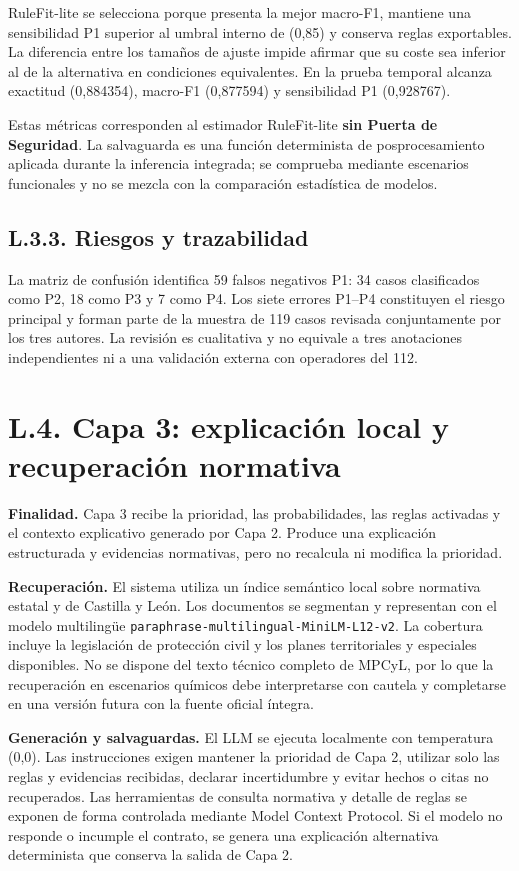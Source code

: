 RuleFit-lite se selecciona porque presenta la mejor macro-F1, mantiene una sensibilidad
P1 superior al umbral interno de (0{,}85) y conserva reglas exportables. La diferencia
entre los tamaños de ajuste impide afirmar que su coste sea inferior al de la alternativa
en condiciones equivalentes. En la prueba temporal alcanza
exactitud (0{,}884354), macro-F1 (0{,}877594) y sensibilidad P1 (0{,}928767).

Estas métricas corresponden al estimador RuleFit-lite \textbf{sin Puerta de Seguridad}.
La salvaguarda es una función determinista de posprocesamiento aplicada durante la
inferencia integrada; se comprueba mediante escenarios funcionales y no se mezcla con
la comparación estadística de modelos.

\subsection*{L.3.3. Riesgos y trazabilidad}

La matriz de confusión identifica 59 falsos negativos P1: 34 casos clasificados como
P2, 18 como P3 y 7 como P4. Los siete errores P1--P4 constituyen el riesgo principal y
forman parte de la muestra de 119 casos revisada conjuntamente por los tres autores. La
revisión es cualitativa y no equivale a tres anotaciones independientes ni a una
validación externa con operadores del 112.

\section*{L.4. Capa 3: explicación local y recuperación normativa}

\textbf{Finalidad.} Capa 3 recibe la prioridad, las probabilidades, las reglas activadas
y el contexto explicativo generado por Capa 2. Produce una explicación estructurada y
evidencias normativas, pero no recalcula ni modifica la prioridad.

\textbf{Recuperación.} El sistema utiliza un índice semántico local sobre normativa
estatal y de Castilla y León. Los documentos se segmentan y representan con el modelo
multilingüe \texttt{paraphrase-multilingual-MiniLM-L12-v2}. La cobertura incluye la
legislación de protección civil y los planes territoriales y especiales disponibles. No
se dispone del texto técnico completo de MPCyL, por lo que la recuperación en escenarios
químicos debe interpretarse con cautela y completarse en una versión futura con la
fuente oficial íntegra.

\textbf{Generación y salvaguardas.} El LLM se ejecuta localmente con temperatura
(0{,}0). Las instrucciones exigen mantener la prioridad de Capa 2, utilizar solo las
reglas y evidencias recibidas, declarar incertidumbre y evitar hechos o citas no
recuperados. Las herramientas de consulta normativa y detalle de reglas se exponen de
forma controlada mediante Model Context Protocol. Si el modelo no responde o incumple
el contrato, se genera una explicación alternativa determinista que conserva la salida
de Capa 2.

